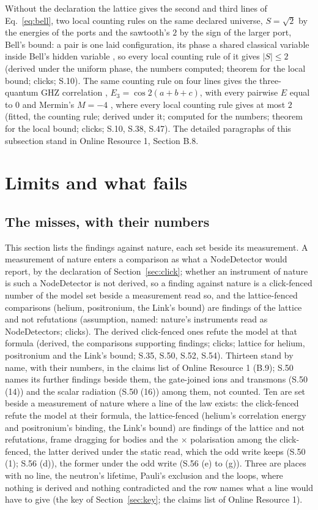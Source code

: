 \documentclass[pdflatex,sn-mathphys-num]{sn-jnl}
\theoremstyle{thmstyleone}
\theoremstyle{thmstyletwo}
\begin{document}
Without the declaration the lattice gives the second and third lines of Eq.~\eqref{eq:bell}, two local counting rules on the same declared universe, $S = \sqrt 2$ by the energies of the ports and the sawtooth's $2$ by the sign of the larger port, Bell's bound: a pair is one laid configuration, its phase a shared classical variable inside Bell's hidden variable \cite{bell}, so every local counting rule of it gives $|S| \le 2$ \cite{chsh} (derived under the uniform phase, the numbers computed; theorem for the local bound; clicks; S.10). The same counting rule on four lines gives the three-quantum GHZ correlation \cite{ghz}, $E_3 = \cos 2(a + b + c)$, with every pairwise $E$ equal to $0$ and Mermin's $M = -4$ \cite{mermin}, where every local counting rule gives at most $2$ (fitted, the counting rule; derived under it; computed for the numbers; theorem for the local bound; clicks; S.10, S.38, S.47). The detailed paragraphs of this subsection stand in Online Resource 1, Section B.8.
\section{Limits and what fails}\label{sec:limits}

\subsection{The misses, with their numbers}\label{sec:misses}

This section lists the findings against nature, each set beside its measurement. A measurement of nature enters a comparison as what a NodeDetector would report, by the declaration of Section~\ref{sec:click}; whether an instrument of nature is such a NodeDetector is not derived, so a finding against nature is a click-fenced number of the model set beside a measurement read so, and the lattice-fenced comparisons (helium, positronium, the Link's bound) are findings of the lattice and not refutations (assumption, named: nature's instruments read as NodeDetectors; clicks). The derived click-fenced ones refute the model at that formula (derived, the comparisons supporting findings; clicks; lattice for helium, positronium and the Link's bound; S.35, S.50, S.52, S.54). Thirteen stand by name, with their numbers, in the claims list of Online Resource 1 (B.9); S.50 names its further findings beside them, the gate-joined ions and transmons (S.50 (14)) and the scalar radiation (S.50 (16)) among them, not counted. Ten are set beside a measurement of nature where a line of the law exists: the click-fenced refute the model at their formula, the lattice-fenced (helium's correlation energy and positronium's binding, the Link's bound) are findings of the lattice and not refutations, frame dragging for bodies and the $\times$ polarisation among the click-fenced, the latter derived under the static read, which the odd write keeps (S.50 (1); S.56 (d)), the former under the odd write (S.56 (e) to (g)). Three are places with no line, the neutron's lifetime, Pauli's exclusion and the loops, where nothing is derived and nothing contradicted and the row names what a line would have to give (the key of Section~\ref{sec:key}; the claims list of Online Resource 1).
\end{document}
